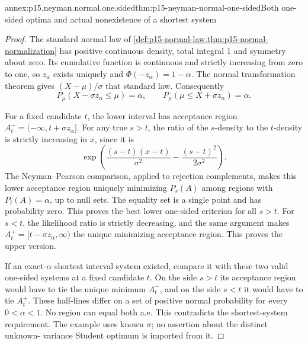 \begin{annexitem}{annex:p15.neyman.normal.one.sided}{thm:p15-neyman-normal-one-sided}{Both one-sided optima and actual nonexistence of a shortest system}
\begin{proof}
The standard normal law of
\cref{def:p15-normal-law,thm:p15-normal-normalization}
has positive continuous density,
total integral 1 and symmetry
about zero. Its cumulative
function is continuous and
strictly increasing from zero
to one, so \(z_\alpha\)
exists uniquely and
\(\Phi(-z_\alpha)=1-\alpha\).
The normal transformation theorem
gives \((X-\mu)/\sigma\)
that standard law.
Consequently
\[
 P_\mu(X-\sigma z_\alpha\leq\mu)=\alpha,\qquad
 P_\mu(\mu\leq X+\sigma z_\alpha)=\alpha.
\]

For a fixed candidate \(t\),
the lower interval has
acceptance region
\(A^-_t=(-\infty,t+\sigma z_\alpha]\).
For any true \(s>t\), the
ratio of the \(s\)-density
to the \(t\)-density is
strictly increasing in \(x\),
since it is
\[
 \exp\left(\frac{(s-t)(x-t)}{\sigma^2}
                         -\frac{(s-t)^2}{2\sigma^2}\right).
\]
The Neyman--Pearson comparison,
applied to rejection complements,
makes this lower acceptance
region uniquely minimizing
\(P_s(A)\) among regions
with \(P_t(A)=\alpha\),
up to null sets.
The equality set is a
single point and has
probability zero.
This proves the best lower
one-sided criterion for all
\(s>t\). For \(s<t\),
the likelihood ratio is
strictly decreasing, and
the same argument makes
\(A^+_t=[t-\sigma z_\alpha,\infty)\)
the unique minimizing
acceptance region. This
proves the upper version.

If an exact-\(\alpha\)
shortest interval system
existed, compare it with
these two valid one-sided
systems at a fixed candidate
\(t\). On the side \(s>t\)
its acceptance region would
have to tie the unique
minimum \(A^-_t\), and
on the side \(s<t\)
it would have to tie
\(A^+_t\).
These half-lines differ
on a set of positive
normal probability for
every \(0<\alpha<1\).
No region can equal
both a.e. This contradicts
the shortest-system requirement.
The example uses known
\(\sigma\); no assertion
about the distinct unknown-
variance Student optimum
is imported from it.
\end{proof}
\end{annexitem}

